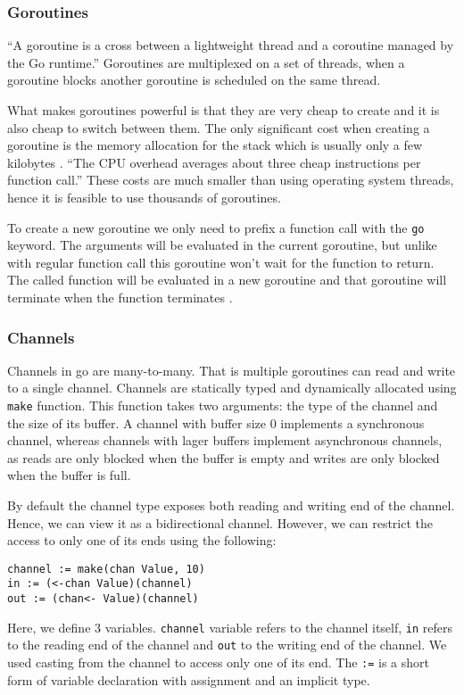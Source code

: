 \subsubsection{Goroutines}
``A goroutine is a cross between a lightweight thread and a coroutine
managed by the Go runtime.'' \cite[2]{whitehead} Goroutines are multiplexed
on a set of threads, when a goroutine blocks another goroutine is scheduled
on the same thread. 

What makes goroutines powerful is that they are very cheap to create and 
it is also cheap to switch between them. The only significant cost when 
creating a goroutine is the memory allocation for the stack which is 
usually only a few kilobytes \cite{FAQ}. ``The CPU overhead averages about 
three cheap instructions per function call.''\cite{FAQ} These costs are much 
smaller than using operating system threads, hence it is feasible to use 
thousands of goroutines.

To create a new goroutine we only need to prefix a function call with
the \texttt{go} keyword. The arguments will be evaluated in the current
goroutine, but unlike with regular function call this goroutine won't
wait for the function to return. The called 
function will be evaluated in a new goroutine and that goroutine will 
terminate when the function terminates \cite{GoDocumentation}.

\subsubsection{Channels}
Channels in go are many-to-many. That is multiple goroutines can
read and write to a single channel. Channels are statically typed and
dynamically allocated using \texttt{make} function. This function takes 
two arguments: the type of the channel and the size of its buffer.
A channel with buffer size 0 implements a synchronous channel, whereas 
channels with lager buffers implement asynchronous channels, as reads
are only blocked when the buffer is empty and writes are only blocked
when the buffer is full.

By default the channel type exposes both reading and writing end of the
channel. Hence, we can view it as a bidirectional channel. 
However, we can restrict the access to only one of its ends using the following:
\begin{lstlisting}
channel := make(chan Value, 10)
in := (<-chan Value)(channel)
out := (chan<- Value)(channel)
\end{lstlisting}
Here, we define 3 variables. \texttt{channel} variable refers to the 
channel itself, \texttt{in} refers to the reading end of the channel
and \texttt{out} to the writing end of the channel. We used casting
from the channel to access only one of its end. The \texttt{:=} is a
short form of variable declaration with assignment and an implicit type.

